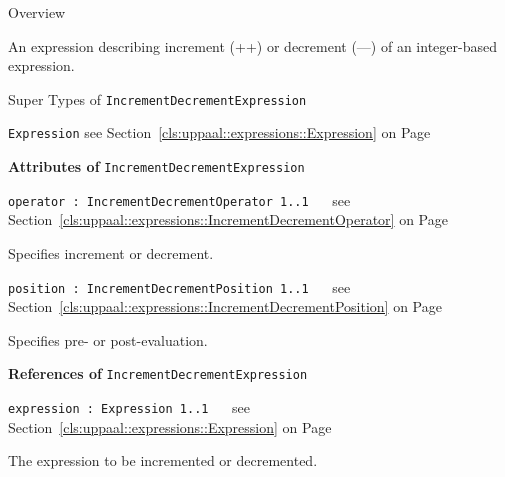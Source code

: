 	\begin{longdescription}
		\item[Overview] 		
				

	

		An expression describing increment (++) or decrement (---) of an integer-based expression. 		
		\item[Super Types of \texttt{IncrementDecrementExpression}] ~
			\begin{longdescription}
				\item[\texttt{Expression}] see Section~\ref{cls:uppaal::expressions::Expression} on Page~\pageref{cls:uppaal::expressions::Expression}						\end{longdescription}
		
	
			\item[\textbf{Attributes of} \texttt{IncrementDecrementExpression}] ~
			\begin{longdescription}
	\item[\texttt{operator : IncrementDecrementOperator 	\symbol{"5B}1..1\symbol{"5D}
}] ~
	see Section~\ref{cls:uppaal::expressions::IncrementDecrementOperator} on Page~\pageref{cls:uppaal::expressions::IncrementDecrementOperator}
	
	\nopagebreak
		
				

	

		Specifies increment or decrement.		
	\item[\texttt{position : IncrementDecrementPosition 	\symbol{"5B}1..1\symbol{"5D}
}] ~
	see Section~\ref{cls:uppaal::expressions::IncrementDecrementPosition} on Page~\pageref{cls:uppaal::expressions::IncrementDecrementPosition}
	
	\nopagebreak
		
				

	

		Specifies pre- or post-evaluation.		
			\end{longdescription}
			\item[\textbf{References of} \texttt{IncrementDecrementExpression}] ~
			\begin{longdescription}
	\item[\texttt{expression : Expression 	\symbol{"5B}1..1\symbol{"5D}
}] ~
	see Section~\ref{cls:uppaal::expressions::Expression} on Page~\pageref{cls:uppaal::expressions::Expression}
	
	\nopagebreak
		
				

	

		The expression to be incremented or decremented.		
			\end{longdescription}
	
	\end{longdescription}
	

